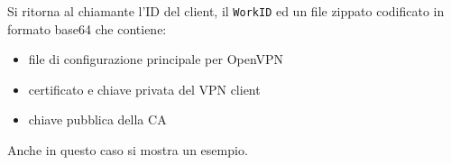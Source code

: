 Si ritorna al chiamante l'ID del client, il \texttt{WorkID} ed un file zippato codificato in formato
base64 che contiene:
\begin{itemize}
	\item file di configurazione principale per OpenVPN
	\item certificato e chiave privata del VPN client
	\item chiave pubblica della CA
\end{itemize}
Anche in questo caso si mostra un esempio.
\inputminted[tabsize=4, breaklines, fontsize=\footnotesize]{python}{code_samples/controllers_create_client.py}